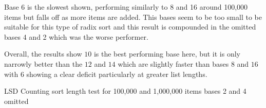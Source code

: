 \documentclass[12pt]{article}
\begin{document}
	\par
	Base $6$ is the slowest shown, performing similarly to 8 and 16 around 100,000 items but falls off as more items are added. This bases seem to be too small to be suitable for this type of radix sort and this result is compounded in the omitted bases 4 and 2 which was the worse performer.
	\par
	Overall, the results show $10$ is the best performing base here, but it is only narrowly better than the $12$ and $14$ which are slightly faster than bases $8$ and $16$ with 6 showing a clear deficit particularly at greater list lengths.

	\begin{table}[h]
		\centering
		\captionsetup{type=figure}
			\caption{LSD Counting sort length test for 100,000 and 1,000,000 items \newline bases 2 and 4 omitted\label{fig:lsdclength}}
			
			
	\end{table}
	\pagebreak
\end{document}
